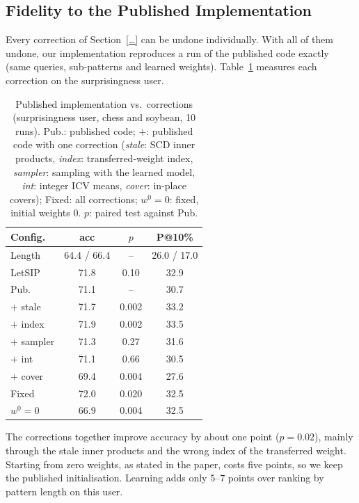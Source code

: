\subsection{Fidelity to the Published Implementation}
\label{subsec:fidelity}

Every correction of Section~\ref{…} can be undone individually. With all of them undone, our implementation
reproduces a run of the published code exactly (same queries, sub-patterns and learned weights).
Table~\ref{tab:fidelity} measures each correction on the surprisingness user.

\begin{table}[t]
\centering
\caption{Published implementation vs.\ corrections (surprisingness user, chess and soybean, 10 runs).
Pub.: published code; $+$: published code with one correction (\emph{stale}: SCD inner products,
\emph{index}: transferred-weight index, \emph{sampler}: sampling with the learned model, \emph{int}: integer
ICV means, \emph{cover}: in-place covers); Fixed: all corrections; $w^0 = 0$: fixed, initial weights $0$.
$p$: paired test against Pub.}
\label{tab:fidelity}
\small
\begin{tabular}{lccc}
\toprule
Config. & acc & $p$ & P@10\% \\
\midrule
Length          & 64.4 / 66.4 & --    & 26.0 / 17.0 \\
LetSIP          & 71.8 & 0.10  & 32.9 \\
Pub.            & 71.1 & --    & 30.7 \\
$+$ stale       & 71.7 & 0.002 & 33.2 \\
$+$ index       & 71.9 & 0.002 & 33.5 \\
$+$ sampler     & 71.3 & 0.27  & 31.6 \\
$+$ int         & 71.1 & 0.66  & 30.5 \\
$+$ cover       & 69.4 & 0.004 & 27.6 \\
Fixed           & 72.0 & 0.020 & 32.5 \\
$w^0 = 0$       & 66.9 & 0.004 & 32.5 \\
\bottomrule
\end{tabular}
\end{table}

The corrections together improve accuracy by about one point ($p = 0.02$), mainly through the stale inner
products and the wrong index of the transferred weight. Starting from zero weights, as stated in the paper,
costs five points, so we keep the published initialisation. Learning adds only $5$--$7$ points over ranking
by pattern length on this user.

